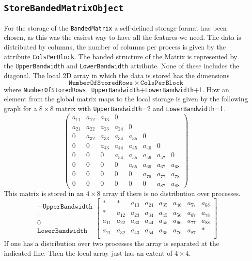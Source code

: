 \subsection{\texttt{StoreBandedMatrixObject}}
For the storage of the \texttt{BandedMatrix} a self-defined storage
format has been chosen, as this was the easiest way to have all the
features we need. The data is distributed by columns, the number of
columns per process is given by the attribute
\texttt{ColsPerBlock}. The banded structure of the Matrix is
represented by the \texttt{UpperBandwidth} and \texttt{LowerBandwidth}
attribute. None of these includes the diagonal. The local 2D array in
which the data is stored has the dimensions
\begin{displaymath}
  \mathtt{NumberOfStoredRows} \times\mathtt{ColsPerBlock} 
\end{displaymath}
where
\texttt{NumberOfStoredRows}=\texttt{UpperBandwidth}+\texttt{LowerBandwidth}+1. How
an element from the global matrix maps to the local storage is given
by the following graph for a $8\times8$ matrix with \texttt{UpperBandwidth}=2 and
\texttt{LowerBandwidth}=1.
\begin{equation}
  \label{eq:matrix}
  \left(\begin{array}{cccc|cccc}
    a_{11} &a_{12} &a_{13}& 0\\
    a_{21} &a_{22} &a_{23}& a_{24} & 0\\
    0 &a_{32} &a_{33}& a_{34} & a_{35} & 0\\
    0 & 0 &a_{43} &a_{44}& a_{45} & a_{46} & 0\\
    0 & 0 &0 &a_{54} &a_{55}& a_{56} & a_{57} & 0\\
    0 & 0 & 0 &0 &a_{65} &a_{66}& a_{67} & a_{68}\\
    0 & 0 & 0 & 0 &0 &a_{76} &a_{77}& a_{78}\\
    0 & 0 & 0 & 0 & 0 &0 &a_{87} &a_{88}
  \end{array}\right)
\end{equation}
This matrix is stored in an $4\times8$ array if there is no
distribution over processes.
\begin{displaymath}
  \begin{array}{c}
    -\mathtt{UpperBandwidth}\\
    \vdots\\
    0\\
    \mathtt{LowerBandwidth}
  \end{array}
\left[
  \begin{array}{cccc|cccc}
    * & * & a_{13} &  a_{24} & a_{35} & a_{46} & a_{57} & a_{68}\\
    * & a_{12} & a_{23} & a_{34} & a_{45} & a_{56} & a_{67} & a_{78}\\
    a_{11} & a_{22} & a_{33} & a_{44} & a_{55} & a_{66} & a_{77} & a_{88}\\
    a_{21} & a_{32} & a_{43} & a_{54} & a_{65} & a_{76} & a_{87} & *\\
  \end{array}
\right]
\end{displaymath}
If one has a distribution over two processes the array is separated at
the indicated line. Then the local array just has an extent of
$4\times4$.

